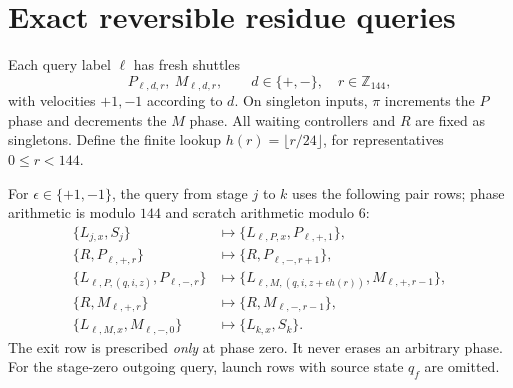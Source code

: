 \documentclass[11pt,letterpaper]{article}
\numberwithin{equation}{section}
\theoremstyle{definition}
\theoremstyle{remark}
\newcommand{\Z}{\mathbb Z}
\begin{document}
\section{Exact reversible residue queries}\label{smc:tm:sec:query}

Each query label $\ell$ has fresh shuttles
\[
P_{\ell,d,r},\ M_{\ell,d,r},\qquad d\in\{+,-\},\quad r\in\Z_{144},
\]
with velocities $+1,-1$ according to $d$. On singleton inputs, $\pi$ increments the $P$ phase and decrements the $M$ phase. All waiting controllers and $R$ are fixed as singletons. Define the finite lookup $h(r)=\lfloor r/24\rfloor$, for representatives $0\le r<144$.

For $\epsilon\in\{+1,-1\}$, the query from stage $j$ to $k$ uses the following pair rows; phase arithmetic is modulo $144$ and scratch arithmetic modulo $6$:
\begin{align}
\{L_{j,x},S_j\}&\longmapsto\{L_{\ell,P,x},P_{\ell,+,1}\},\label{smc:tm:eq:querylaunch}\\
\{R,P_{\ell,+,r}\}&\longmapsto\{R,P_{\ell,-,r+1}\},\\
\{L_{\ell,P,(q,i,z)},P_{\ell,-,r}\}&\longmapsto
 \{L_{\ell,M,(q,i,z+\epsilon h(r))},M_{\ell,+,r-1}\},\label{smc:tm:eq:queryturn}\\
\{R,M_{\ell,+,r}\}&\longmapsto\{R,M_{\ell,-,r-1}\},\\
\{L_{\ell,M,x},M_{\ell,-,0}\}&\longmapsto\{L_{k,x},S_k\}.\label{smc:tm:eq:queryexit}
\end{align}
The exit row is prescribed \emph{only} at phase zero. It never erases an arbitrary phase. For the stage-zero outgoing query, launch rows with source state $q_f$ are omitted.
\end{document}
